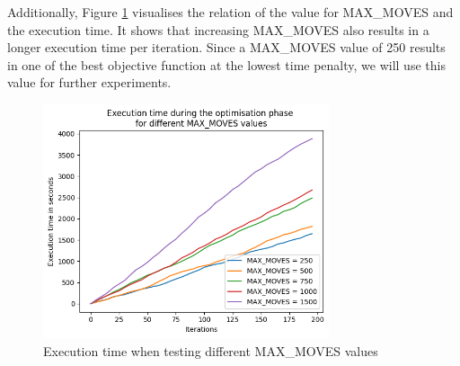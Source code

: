 Additionally, Figure \ref{fig:tuning_execution} visualises the relation of the value for MAX\_MOVES and the execution time. It shows that increasing MAX\_MOVES also results in a longer execution time per iteration. Since a MAX\_MOVES value of 250 results in one of the best objective function at the lowest time penalty, we will use this value for further experiments. 

\begin{figure}[H]
	\centering
	\includegraphics[width=0.75\textwidth]{images/tuning/max_moves_execution.png} 
	\caption{Execution time when testing different MAX\_MOVES values}
	\label{fig:tuning_execution}
\end{figure}
